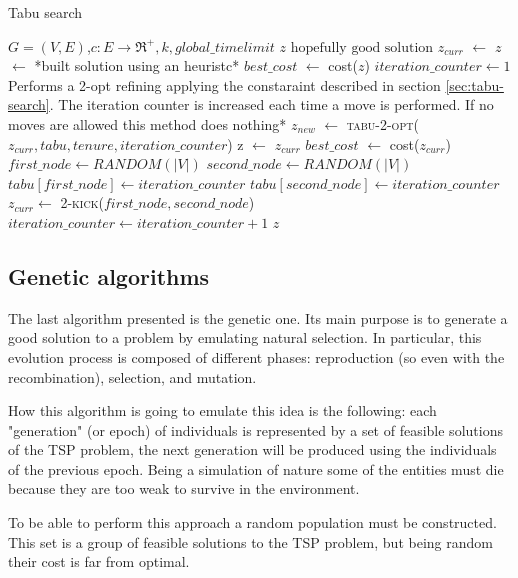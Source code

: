 \begin{algorithm}
	\caption{Tabu search}\label{algo:tabu-search}
	\begin{algorithmic}[1]
		\Require $G=(V,E)$,$ c:E\rightarrow \Re^+, k, global\_timelimit$
		\Ensure $z\text{ hopefully good solution}$
		\State $z_{curr}$ $\gets$ $z$ $\gets$ *built solution using an heuristc*
		\State $best\_cost$ $\gets$ cost($z$)
		\State $iteration\_counter \gets 1$
			\State *Performs a 2-opt refining applying the constaraint described in section \ref{sec:tabu-search}. The iteration counter is increased each time a move is performed. If no moves are allowed this method does nothing*
			\State $z_{new}$ $\gets$ \textsc{tabu-2-opt($z_{curr}, tabu, tenure, iteration\_counter$)}
				\State z $\gets$ $z_{curr}$
				\State $best\_cost$ $\gets$ cost($z_{curr}$)
			\EndIf
			\State $first\_node \gets RANDOM(|V|)$
			\State $second\_node \gets RANDOM(|V|)$
			\State $tabu[first\_node] \gets iteration\_counter$
			\State $tabu[second\_node] \gets iteration\_counter$
			\State $z_{curr} \gets $ \textsc{2-kick($first\_node, second\_node$)}
			\State $iteration\_counter \gets iteration\_counter+1$
		\EndWhile
		\State \Return $z$
	\end{algorithmic}
\end{algorithm}

\subsection{Genetic algorithms}
The last algorithm presented is the genetic one. Its main purpose is to generate a good solution to a problem by emulating natural selection. In particular, this evolution process is composed of different phases: reproduction (so even with the recombination), selection, and mutation.

How this algorithm is going to emulate this idea is the following: each "generation" (or epoch) of individuals is represented by a set of feasible solutions of the TSP problem, the next generation will be produced using the individuals of the previous epoch. Being a simulation of nature some of the entities must die because they are too weak to survive in the environment.

To be able to perform this approach a random population must be constructed. This set is a group of feasible solutions to the TSP problem, but being random their cost is far from optimal.

